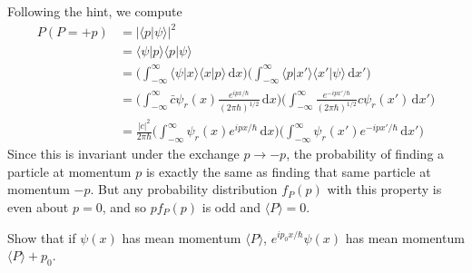 \documentclass[../principles-of-quantum-mechanics.tex]{subfiles}
\begin{document}
\begin{questions}
	\begin{solution}
		Following the hint, we compute
		\begin{align*}
			P(P = {+p}) &= |\langle p |\psi\rangle|^2 \\
			&= \langle \psi |p \rangle \langle p |\psi\rangle \\
			&= \Big(\int_{-\infty}^{\infty}\langle \psi|x\rangle\langle x|p\rangle\,\mathrm{d}x\Big)\Big(\int_{-\infty}^{\infty}\langle p|x'\rangle\langle x'|\psi\rangle\,\mathrm{d}x'\Big) \\
			&= \Big(\int_{-\infty}^{\infty}\bar{c}\psi_r(x)\frac{e^{ipx/\hbar}}{(2\pi\hbar)^{1/2}}\,\mathrm{d}x\Big)\Big(\int_{-\infty}^{\infty}\frac{e^{-ipx'/\hbar}}{(2\pi\hbar)^{1/2}}c\psi_r(x')\,\mathrm{d}x'\Big) \\
			&= \frac{|c|^2}{2\pi\hbar}\Big(\int_{-\infty}^{\infty}\psi_r(x)e^{ipx/\hbar}\,\mathrm{d}x\Big)\Big(\int_{-\infty}^{\infty}\psi_r(x')e^{-ipx'/\hbar}\,\mathrm{d}x'\Big)
		\end{align*}
		Since this is invariant under the exchange $p \to -p$, the probability of finding a particle at momentum $p$ is exactly the same as finding that same particle at momentum $-p$. But any probability distribution $f_P(p)$ with this property is even about $p = 0$, and so $pf_P(p)$ is odd and $\langle P\rangle = 0$.
	\end{solution}
	
	\question Show that if $\psi(x)$ has mean momentum $\langle P\rangle$, $e^{ip_0 x/\hbar}\psi(x)$ has mean momentum $\langle P\rangle + p_0$.
	

\end{questions}
\end{document}
